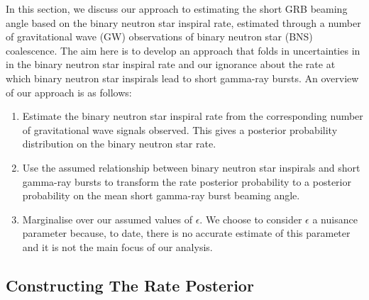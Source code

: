 \documentclass[twocolumn,nofootinbib]{revtex4-1}
\def\bns#1{binary neutron star#1 (BNS#1)\gdef\bns{BNS}}
\def\gw#1{gravitational wave#1 (GW#1)\gdef\gw{GW}}
\begin{document}
In this section, we discuss our approach to estimating the short GRB beaming
angle based on the binary neutron star inspiral rate, estimated through a number
of \gw{} observations of \bns{} coalescence. The aim here is to develop an
approach that folds in uncertainties in in the binary neutron star inspiral rate
and our ignorance about the rate at which binary neutron star inspirals lead to
short gamma-ray bursts.
%
An overview of our approach is as follows:

\begin{enumerate}
\item Estimate the binary neutron star inspiral rate from the corresponding 
number of gravitational wave signals observed. This gives a posterior
probability distribution on the binary neutron star rate.
\item Use the assumed relationship between binary neutron star inspirals
and short gamma-ray bursts to transform the rate posterior probability to
a posterior probability on the mean short gamma-ray burst beaming angle.
\item Marginalise over our assumed values of $\epsilon$. We choose to 
consider $\epsilon$ a nuisance parameter because, to date, there is no 
accurate estimate of this parameter and it is not the main focus of our 
analysis. 
\end{enumerate}


\subsection{Constructing The Rate Posterior}
%
\end{document}
